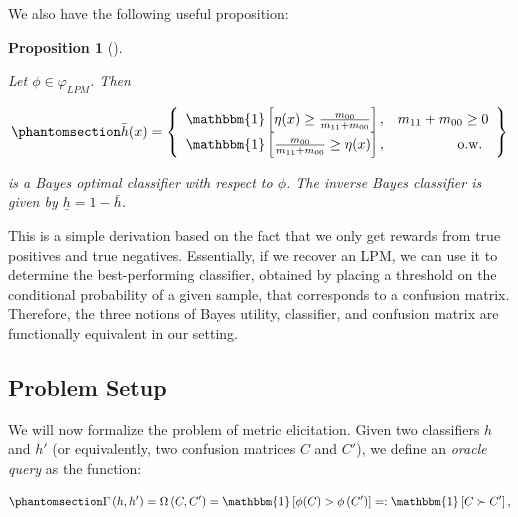 \documentclass[
  letterpaper,
  numbers=noenddot,
  DIV=11]{scrreprt}
\theoremstyle{plain}
\theoremstyle{definition}
\theoremstyle{plain}
\newtheorem{proposition}{Proposition}[chapter]
\theoremstyle{remark}
\begin{document}
We also have the following useful proposition:

\begin{tcolorbox}[colframe=.grey, title=\faPenSquare \enspace Proposition]

\begin{proposition}[]\protect\hypertarget{prp-prp3.1}{}\label{prp-prp3.1}

Let \(\phi \in \varphi_{LPM}\). Then

\begin{equation}\phantomsection\label{eq-eq3.46}{\bar{h}(x) = \left\{\begin{array}{lr}
\mathbbm{1}\left[\eta(x) \geq \frac{m_{00}}{m_{11} + m_{00}}\right], & m_{11} + m_{00} \geq 0 \\
\mathbbm{1}\left[\frac{m_{00}}{m_{11} + m_{00}} \geq \eta(x)\right], & \text { o.w. }
\end{array}\right\}}\end{equation}

is a Bayes optimal classifier with respect to \(\phi\). The inverse
Bayes classifier is given by \(\underline{h} = 1 - \bar{h}\).

\end{proposition}

\end{tcolorbox}

This is a simple derivation based on the fact that we only get rewards
from true positives and true negatives. Essentially, if we recover an
LPM, we can use it to determine the best-performing classifier, obtained
by placing a threshold on the conditional probability of a given sample,
that corresponds to a confusion matrix. Therefore, the three notions of
Bayes utility, classifier, and confusion matrix are functionally
equivalent in our setting.

\subsection{Problem Setup}\label{sec-metric-elicitation-setup}

We will now formalize the problem of metric elicitation. Given two
classifiers \(h\) and \(h'\) (or equivalently, two confusion matrices
\(C\) and \(C'\)), we define an \emph{oracle query} as the function:

\begin{equation}\phantomsection\label{eq-oracle}{\Gamma\left(h, h^{\prime}\right)=\Omega\left(C, C^{\prime}\right)=\mathbbm{1}\left[\phi(C)>\phi\left(C^{\prime}\right)\right]=: \mathbbm{1} \left[C \succ C^{\prime}\right],}\end{equation}
\end{document}
